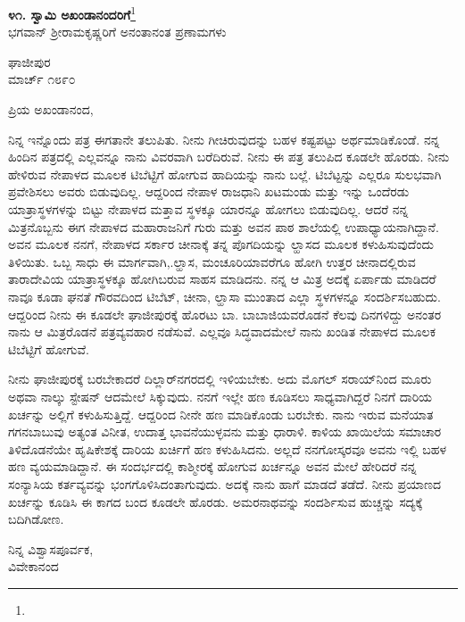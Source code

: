 \begin{center}
\textbf{೪೧. ಸ್ವಾಮಿ ಅಖಂಡಾನಂದರಿಗೆ}\footnote{}\\ ಭಗವಾನ್ ಶ‍್ರೀರಾಮಕೃಷ್ಣರಿಗೆ ಅನಂತಾನಂತ ಪ್ರಣಾಮಗಳು
\end{center}

\vspace{-0.5cm}

\begin{flushright}
ಘಾಜೀಪುರ\\ಮಾರ್ಚ್ ೧೮೯೦
\end{flushright}

\noindent
ಪ್ರಿಯ ಅಖಂಡಾನಂದ,

ನಿನ್ನ ಇನ್ನೊಂದು ಪತ್ರ ಈಗತಾನೇ ತಲುಪಿತು. ನೀನು ಗೀಚಿರುವುದನ್ನು ಬಹಳ ಕಷ್ಟಪಟ್ಟು ಅರ್ಥಮಾಡಿಕೊಂಡೆ. ನನ್ನ ಹಿಂದಿನ ಪತ್ರದಲ್ಲಿ ಎಲ್ಲವನ್ನೂ ನಾನು ವಿವರವಾಗಿ ಬರೆದಿರುವೆ. ನೀನು ಈ ಪತ್ರ ತಲುಪಿದ ಕೂಡಲೇ ಹೊರಡು. ನೀನು ಹೇಳಿರುವ ನೇಪಾಳದ ಮೂಲಕ ಟಿಬೆಟ್ಟಿಗೆ ಹೋಗುವ ಹಾದಿಯನ್ನು ನಾನು ಬಲ್ಲೆ. ಟಿಬೆಟ್ಟನ್ನು ಎಲ್ಲರೂ ಸುಲಭವಾಗಿ ಪ್ರವೇಶಿಸಲು ಅವರು ಬಿಡುವುದಿಲ್ಲ. ಆದ್ದರಿಂದ ನೇಪಾಳ ರಾಜಧಾನಿ ಖಟಮಂಡು ಮತ್ತು ಇನ್ನು ಒಂದೆರಡು ಯಾತ್ರಾಸ್ಥಳಗಳನ್ನು ಬಿಟ್ಟು ನೇಪಾಳದ ಮತ್ತಾವ ಸ್ಥಳಕ್ಕೂ ಯಾರನ್ನೂ ಹೋಗಲು ಬಿಡುವುದಿಲ್ಲ. ಆದರೆ ನನ್ನ ಮಿತ್ರನೊಬ್ಬನು ಈಗ ನೇಪಾಳದ ಮಹಾರಾಜನಿಗೆ ಗುರು ಮತ್ತು ಅವನ ಪಾಠ ಶಾಲೆಯಲ್ಲಿ ಉಪಾಧ್ಯಾಯನಾಗಿದ್ದಾನೆ. ಅವನ ಮೂಲಕ ನನಗೆ, ನೇಪಾಳದ ಸರ್ಕಾರ ಚೀನಾಕ್ಕೆ ತನ್ನ ಪೊಗದಿಯನ್ನು ಲ್ಹಾಸದ ಮೂಲಕ ಕಳುಹಿಸುವುದೆಂದು ತಿಳಿಯಿತು. ಒಬ್ಬ ಸಾಧು ಈ ಮಾರ್ಗವಾಗಿ,.ಲ್ಹಾಸ, ಮಂಚೂರಿಯಾವರೆಗೂ ಹೋಗಿ ಉತ್ತರ ಚೀನಾದಲ್ಲಿರುವ ತಾರಾದೇವಿಯ ಯಾತ್ರಾಸ್ಥಳಕ್ಕೂ ಹೋಗಿಬರುವ ಸಾಹಸ ಮಾಡಿದನು. ನನ್ನ ಆ ಮಿತ್ರ ಅದಕ್ಕೆ ಏರ್ಪಾಡು ಮಾಡಿದರೆ ನಾವೂ ಕೂಡಾ ಘನತೆ ಗೌರವದಿಂದ ಟಿಬೆಟ್, ಚೀನಾ, ಲ್ಹಾಸಾ ಮುಂತಾದ ಎಲ್ಲಾ ಸ್ಥಳಗಳನ್ನೂ ಸಂದರ್ಶಿಸಬಹುದು. ಆದ್ದರಿಂದ ನೀನು ಈ ಕೂಡಲೇ ಘಾಜೀಪುರಕ್ಕೆ ಹೊರಟು ಬಾ. ಬಾಬಾಜಿಯವರೊಡನೆ ಕೆಲವು ದಿನಗಳಿದ್ದು ಅನಂತರ ನಾನು ಆ ಮಿತ್ರರೊಡನೆ ಪತ್ರವ್ಯವಹಾರ ನಡೆಸುವೆ. ಎಲ್ಲವೂ ಸಿದ್ಧವಾದಮೇಲೆ ನಾನು ಖಂಡಿತ ನೇಪಾಳದ ಮೂಲಕ ಟಿಬೆಟ್ಟಿಗೆ ಹೋಗುವೆ.

ನೀನು ಘಾಜೀಪುರಕ್ಕೆ ಬರಬೇಕಾದರೆ ದಿಲ್ಲಾರ್‌ನಗರದಲ್ಲಿ ಇಳಿಯಬೇಕು. ಅದು ಮೊಗಲ್‌ ಸರಾಯ್‌ನಿಂದ ಮೂರು ಅಥವಾ ನಾಲ್ಕು ಸ್ಟೇಷನ್ ಆದಮೇಲೆ ಸಿಕ್ಕುವುದು. ನನಗೆ ಇಲ್ಲೇ ಹಣ ಕೂಡಿಸಲು ಸಾಧ್ಯವಾಗಿದ್ದರೆ ನಿನಗೆ ದಾರಿಯ ಖರ್ಚನ್ನು ಅಲ್ಲಿಗೆ ಕಳುಹಿಸುತ್ತಿದ್ದೆ. ಆದ್ದರಿಂದ ನೀನೇ ಹಣ ಮಾಡಿಕೊಂಡು ಬರಬೇಕು. ನಾನು ಇರುವ ಮನೆಯಾತ ಗಗನಬಾಬುವು ಅತ್ಯಂತ ವಿನೀತ, ಉದಾತ್ತ ಭಾವನೆಯುಳ್ಳವನು ಮತ್ತು ಧಾರಾಳಿ. ಕಾಳಿಯ ಖಾಯಿಲೆಯ ಸಮಾಚಾರ ತಿಳಿದೊಡನೆಯೇ ಹೃಷಿಕೇಶಕ್ಕೆ ದಾರಿಯ ಖರ್ಚಿಗೆ ಹಣ ಕಳುಹಿಸಿದನು. ಅಲ್ಲದೆ ನನಗೋಸ್ಕರವೂ ಅವನು ಇಲ್ಲಿ ಬಹಳ ಹಣ ವ್ಯಯಮಾಡಿದ್ದಾನೆ. ಈ ಸಂದರ್ಭದಲ್ಲಿ ಕಾಶ್ಮೀರಕ್ಕೆ ಹೋಗುವ ಖರ್ಚನ್ನೂ ಅವನ ಮೇಲೆ ಹೇರಿದರೆ ನನ್ನ ಸಂನ್ಯಾಸಿಯ ಕರ್ತವ್ಯವನ್ನು ಭಂಗಗೊಳಿಸಿದಂತಾಗುವುದು. ಅದಕ್ಕೆ ನಾನು ಹಾಗೆ ಮಾಡದೆ ತಡೆದೆ. ನೀನು ಪ್ರಯಾಣದ ಖರ್ಚನ್ನು ಕೂಡಿಸಿ ಈ ಕಾಗದ ಬಂದ ಕೂಡಲೇ ಹೊರಡು. ಅಮರನಾಥವನ್ನು ಸಂದರ್ಶಿಸುವ ಹುಚ್ಚನ್ನು ಸದ್ಯಕ್ಕೆ ಬದಿಗಿಡೋಣ.

\vspace{-0.3cm}

{\flushright
ನಿನ್ನ ವಿಶ್ವಾಸಪೂರ್ವಕ,\\ವಿವೇಕಾನಂದ\par}

